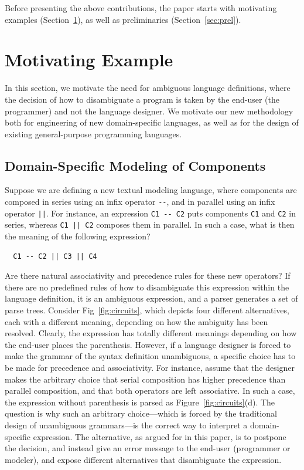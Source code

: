 \documentclass[runningheads]{llncs}
\begin{document}
\noindent Before presenting the above contributions, the paper starts with motivating examples (Section~\ref{sec:motivation}), as well as preliminaries (Section~\ref{sec:prel}).




\section{Motivating Example}
\label{sec:motivation}
In this section, we motivate the need for ambiguous language definitions, where the decision of how to disambiguate a program is taken by the end-user (the programmer) and not the language designer. We motivate our new methodology both for engineering of new domain-specific languages, as well as for the design of existing general-purpose programming languages.

\subsection{Domain-Specific Modeling of Components}
Suppose we are defining a new textual modeling language, where components are composed in series using an infix operator \verb~--~, and in parallel using an infix operator \verb~||~. For instance, an expression \verb~C1 -- C2~ puts components \verb~C1~ and \verb~C2~ in series, whereas \verb~C1 || C2~ composes them in parallel. In such a case, what is then the meaning of the following expression?
\begin{verbatim}
  C1 -- C2 || C3 || C4
\end{verbatim}

\noindent Are there natural associativity and precedence rules for these new operators? If there are no predefined rules of how to disambiguate this expression within the language definition, it is an ambiguous expression, and a parser generates a set of parse trees. Consider Fig~\ref{fig:circuits}, which depicts four different alternatives, each with a different meaning, depending on how the ambiguity has been resolved. Clearly, the expression has totally different meanings depending on how the end-user places the parenthesis. However, if a language designer is forced to make the grammar of the syntax definition unambiguous, a specific choice has to be made for precedence and associativity. For instance, assume that the designer makes the arbitrary choice that serial composition has higher precedence than parallel composition, and that both operators are left associative. In such a case, the expression without parenthesis is parsed as Figure~\ref{fig:circuits}(d). The question is why such an arbitrary choice---which is forced by the traditional design of unambiguous grammars---is the correct way to interpret a domain-specific expression. The alternative, as argued for in this paper, is to postpone the decision, and instead give an error message to the end-user (programmer or modeler), and expose different alternatives that disambiguate the expression.
\end{document}

